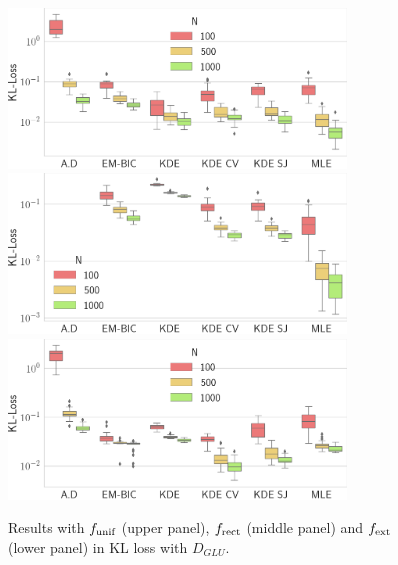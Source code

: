 \begin{figure}
\center
    \includegraphics[width=0.8\textwidth]{./TeX_files/res_uniform_KL_GLU.png}
    \includegraphics[width=0.8\textwidth]{./TeX_files/res_rect_KL_GLU.png}
    \includegraphics[width=0.8\textwidth]{./TeX_files/res_lapl_gauss_not_dict_KL_GLU.png}
    \caption{Results with $f_{\textnormal{unif}}$ (upper panel), $f_{\textnormal{rect}}$ 
    (middle panel) and $f_{\textnormal{ext}}$ (lower panel) in KL loss with $D_{GLU}$.}
    \label{fig:res_gauss_KL_GLU}
\end{figure}   
